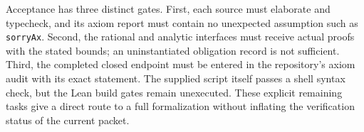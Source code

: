 Acceptance has three distinct gates.  First, each source must elaborate and
typecheck, and its axiom report must contain no unexpected assumption such as
\texttt{sorryAx}.  Second, the rational and analytic interfaces must receive
actual proofs with the stated bounds; an uninstantiated obligation record is
not sufficient.  Third, the completed closed endpoint must be entered in the
repository's axiom audit with its exact statement.  The supplied script itself
passes a shell syntax check, but the Lean build gates remain unexecuted.
These explicit remaining tasks give a direct route to a full formalization
without inflating the verification status of the current packet.
